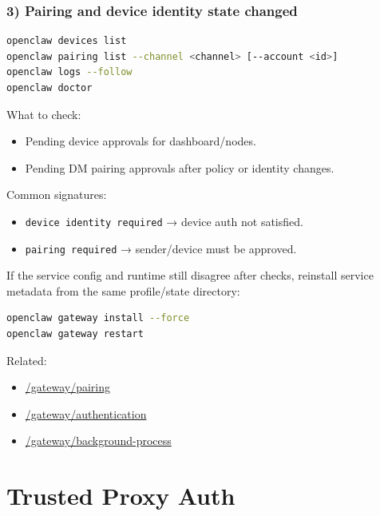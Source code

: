 \subsubsection{3) Pairing and device identity state changed}


\begin{lstlisting}[language=bash]
openclaw devices list
openclaw pairing list --channel <channel> [--account <id>]
openclaw logs --follow
openclaw doctor
\end{lstlisting}


What to check:

\begin{itemize}
  \item Pending device approvals for dashboard/nodes.
  \item Pending DM pairing approvals after policy or identity changes.
\end{itemize}


Common signatures:

\begin{itemize}
  \item \texttt{device identity required} → device auth not satisfied.
  \item \texttt{pairing required} → sender/device must be approved.
\end{itemize}


If the service config and runtime still disagree after checks, reinstall service metadata from the same profile/state directory:

\begin{lstlisting}[language=bash]
openclaw gateway install --force
openclaw gateway restart
\end{lstlisting}


Related:

\begin{itemize}
  \item \href{/gateway/pairing}{/gateway/pairing}
  \item \href{/gateway/authentication}{/gateway/authentication}
  \item \href{/gateway/background-process}{/gateway/background-process}
\end{itemize}



\clearpage

\section{Trusted Proxy Auth}


